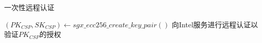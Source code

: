 \begin{algorithm}[h]
    \caption{一次性远程认证}
    $(PK_{CSP}, SK_{CSP}) \leftarrow sgx\_ecc256\_create\_key\_pair()$\;
    向Intel服务进行远程认证以验证$PK_{CSP}$的授权\;
    \KwRet{}\;
\label{algo:attestation}
\end{algorithm} 
